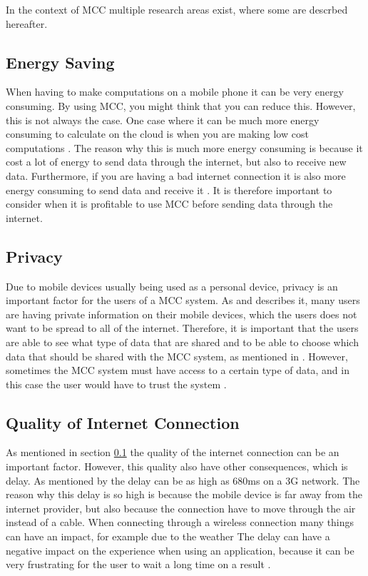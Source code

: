 In the context of MCC multiple research areas exist, where some are descrbed hereafter.
\subsection{Energy Saving}\label{EnergySaving}
When having to make computations on a mobile phone it can be very energy consuming.
By using MCC, you might think that you can reduce this.
However, this is not always the case.
One case where it can be much more energy consuming to calculate on the cloud is when you are making low cost computations \citep{goyalmobile,liu2013gearing,fernando2013mobile}.
The reason why this is much more energy consuming is because it cost a lot of energy to send data through the internet, but also to receive new data.
Furthermore, if you are having a bad internet connection it is also more energy consuming to send data and receive it \citep{goyalmobile,liu2013gearing,fernando2013mobile}.
It is therefore important to consider when it is profitable to use MCC before sending data through the internet.

\subsection{Privacy}
Due to mobile devices usually being used as a personal device, privacy is an important factor for the users of a MCC system.
As \citet{liu2013gearing} and \citet{fernando2013mobile} describes it, many users are having private information on their mobile devices, which the users does not want to be spread to all of the internet.
Therefore, it is important that the users are able to see what type of data that are shared and to be able to choose which data that should be shared with the MCC system, as mentioned in \citet{sanaei2014heterogeneity}.
However, sometimes the MCC system must have access to a certain type of data, and in this case the user would have to trust the system \citep{fernando2013mobile}.

\subsection{Quality of Internet Connection}
As mentioned in section \ref{EnergySaving} the quality of the internet connection can be an important factor.
However, this quality also have other consequences, which is delay.
As mentioned by \citep{fernando2013mobile} the delay can be as high as 680ms on a 3G network.
The reason why this delay is so high is because the mobile device is far away from the internet provider, but also because the connection have to move through the air instead of a cable.
When connecting through a wireless connection many things can have an impact, for example due to the weather \citep{dev2014review,kumar2013mobile}
The delay can have a negative impact on the experience when using an application, because it can be very frustrating for the user to wait a long time on a result \citep{hazarika2014mobile}.

